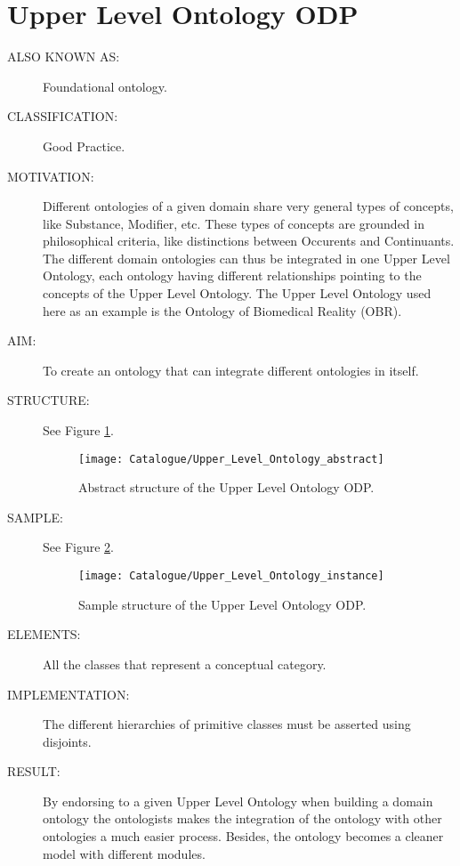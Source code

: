 \section{Upper Level Ontology ODP}\begin{description}
\item [ALSO KNOWN AS:] Foundational ontology.

\item [CLASSIFICATION:] Good Practice.

\item [MOTIVATION:] Different ontologies of a given domain share very general types of concepts, like Substance, Modifier, etc. These types of concepts are grounded in philosophical criteria, like distinctions between Occurents and Continuants. The different domain ontologies can thus be integrated in one Upper Level Ontology, each ontology having different relationships pointing to the concepts of the Upper Level Ontology. The Upper Level Ontology used here as an example is the Ontology of Biomedical Reality (OBR).

\item [AIM:] To create an ontology that can integrate different ontologies in itself.

\item [STRUCTURE:] See Figure \ref{odp:Upper_Level_Ontology_abstract}.
\begin{figure}[]\centering\texttt{[image: Catalogue/Upper\_Level\_Ontology\_abstract]}\caption{\label{odp:Upper_Level_Ontology_abstract} Abstract structure of the Upper Level Ontology ODP.}\end{figure}

\item [SAMPLE:] See Figure \ref{odp:Upper_Level_Ontology_instance}.
\begin{figure}[]\centering\texttt{[image: Catalogue/Upper\_Level\_Ontology\_instance]}\caption{\label{odp:Upper_Level_Ontology_instance} Sample structure of the Upper Level Ontology ODP.}\end{figure}

\item [ELEMENTS:] All the classes that represent a conceptual category.

\item [IMPLEMENTATION:] The different hierarchies of primitive classes must be asserted using disjoints.

\item [RESULT:] By endorsing to a given Upper Level Ontology when building a domain ontology the ontologists makes the integration of the ontology with other ontologies a much easier process. Besides, the ontology becomes a cleaner model with different modules.


\end{description}
